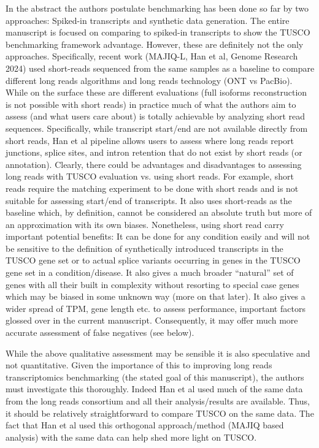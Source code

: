 \documentclass[11pt]{article}
\begin{document}
\begin{reviewercomment}
In the abstract the authors postulate benchmarking has been done so far by two approaches: Spiked-in transcripts and synthetic data generation. The entire manuscript is focused on comparing to spiked-in transcripts to show the TUSCO benchmarking framework advantage. However, these are definitely not the only approaches. Specifically, recent work (MAJIQ-L, Han et al, Genome Research 2024) used short-reads sequenced from the same samples as a baseline to compare different long reads algorithms and long reads technology (ONT vs PacBio). While on the surface these are different evaluations (full isoforms reconstruction is not possible with short reads) in practice much of what the authors aim to assess (and what users care about) is totally achievable by analyzing short read sequences. Specifically, while transcript start/end are not available directly from short reads, Han et al pipeline allows users to assess where long reads report junctions, splice sites, and intron retention that do not exist by short reads (or annotation). Clearly, there could be advantages and disadvantages to assessing long reads with TUSCO evaluation vs. using short reads. For example, short reads require the matching experiment to be done with short reads and is not suitable for assessing start/end of transcripts. It also uses short-reads as the baseline which, by definition, cannot be considered an absolute truth but more of an approximation with its own biases. Nonetheless, using short read carry important potential benefits: It can be done for any condition easily and will not be sensitive to the definition of synthetically introduced transcripts in the TUSCO gene set or to actual splice variants occurring in genes in the TUSCO gene set in a condition/disease. It also gives a much broader ``natural'' set of genes with all their built in complexity without resorting to special case genes which may be biased in some unknown way (more on that later). It also gives a wider spread of TPM, gene length etc. to assess performance, important factors glossed over in the current manuscript. Consequently, it may offer much more accurate assessment of false negatives (see below).

While the above qualitative assessment may be sensible it is also speculative and not quantitative. Given the importance of this to improving long reads transcriptomics benchmarking (the stated goal of this manuscript), the authors must investigate this thoroughly. Indeed Han et al used much of the same data from the long reads consortium and all their analysis/results are available. Thus, it should be relatively straightforward to compare TUSCO on the same data. The fact that Han et al used this orthogonal approach/method (MAJIQ based analysis) with the same data can help shed more light on TUSCO.

\end{reviewercomment}
\end{document}
